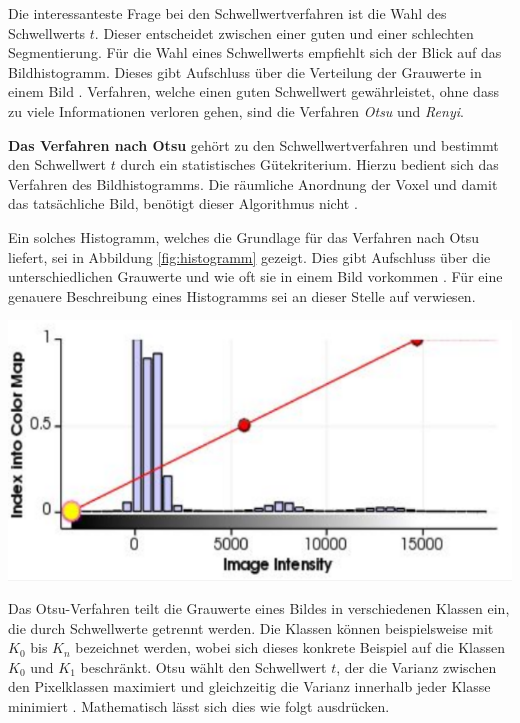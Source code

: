 Die interessanteste Frage bei den Schwellwertverfahren ist die Wahl des Schwellwerts
$t$. Dieser entscheidet zwischen einer guten und einer schlechten Segmentierung.
Für die Wahl eines Schwellwerts empfiehlt sich der Blick auf das Bildhistogramm.
Dieses gibt Aufschluss über die Verteilung der Grauwerte in einem Bild \citep[vgl.][S.~361]{lehmann2013bildverarbeitung}.
Verfahren, welche einen guten Schwellwert gewährleistet, ohne dass zu viele
Informationen verloren gehen, sind die Verfahren \textit{Otsu} und \textit{Renyi}.

\pagebreak

\textbf{Das Verfahren nach Otsu} gehört zu den Schwellwertverfahren und bestimmt
den Schwellwert $t$ durch ein statistisches Gütekriterium. Hierzu bedient sich
das Verfahren des Bildhistogramms. Die räumliche Anordnung der Voxel und damit das
tatsächliche Bild, benötigt dieser Algorithmus nicht \citep[vgl.][S.~264]{lehmann2013bildverarbeitung}.

\begin{minipage}{0.40\textwidth}
	Ein solches Histogramm, welches die Grundlage für das Verfahren nach Otsu
	liefert, sei in Abbildung \ref{fig:histogramm} gezeigt. Dies gibt Aufschluss
	über die unterschiedlichen Grauwerte und wie oft sie in einem Bild vorkommen
	\citep[vgl.][S.~264]{lehmann2013bildverarbeitung}. Für eine genauere
	Beschreibung eines Histogramms sei an dieser Stelle auf \citet[S.~42]{burger2009}
	verwiesen.
\end{minipage}
\hfill
\begin{minipage}{0.50\textwidth}
	\centering
	\includegraphics[width=1\textwidth]{img/histogramm.jpg}
	\label{fig:histogramm}
\end{minipage}

Das Otsu-Verfahren teilt die Grauwerte eines Bildes in verschiedenen Klassen ein,
die durch Schwellwerte getrennt werden. Die Klassen können beispielsweise mit
$K_{0}$ bis $K_{n}$ bezeichnet werden, wobei sich dieses konkrete Beispiel auf die
Klassen $K_{0}$ und $K_{1}$ beschränkt. Otsu wählt den Schwellwert $t$, der die Varianz
zwischen den Pixelklassen maximiert und gleichzeitig die Varianz innerhalb jeder
Klasse minimiert \citep[vgl.][S.~264]{lehmann2013bildverarbeitung}. Mathematisch
lässt sich dies wie folgt ausdrücken.

